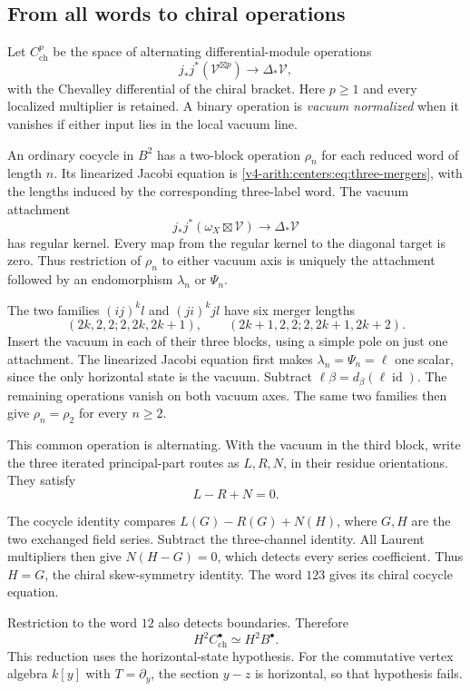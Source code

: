 \subsection{From all words to chiral operations}
\label{v4-arith:centers:subsec:word-reduction}

Let $C^p_{\mathrm{ch}}$
be the space of alternating
differential-module operations
\[
 j_*j^*(\mathscr V^{\boxtimes p})
 \longrightarrow\Delta_*\mathscr V,
\]
with the Chevalley differential
of the chiral bracket.
Here $p\geq1$ and every
localized multiplier is
retained. A binary
operation is
\emph{vacuum normalized}
when it vanishes if
either input lies in
the local vacuum line.

An ordinary cocycle in
$B^2$ has a two-block
operation $\rho_n$ for
each reduced word of
length $n$. Its linearized
Jacobi equation is
\eqref{v4-arith:centers:eq:three-mergers},
with the lengths induced
by the corresponding
three-label word.
The vacuum attachment
\[
 j_*j^*(\omega_X\boxtimes\mathscr V)
 \longrightarrow\Delta_*\mathscr V
\]
has regular kernel.
Every map from the
regular kernel to the
diagonal target is zero.
Thus restriction of
$\rho_n$ to either
vacuum axis is uniquely
the attachment followed
by an endomorphism
$\lambda_n$ or $\Psi_n$.

The two families
$(ij)^kl$ and $(ji)^kjl$
have six merger lengths
\[
 (2k,2,2;2,2k,2k+1),\qquad
 (2k+1,2,2;2,2k+1,2k+2).
\]
Insert the vacuum in
each of their three
blocks, using a simple
pole on just one
attachment. The
linearized Jacobi equation
first makes
$\lambda_n=\Psi_n=\ell$
one scalar, since the
only horizontal state
is the vacuum. Subtract
$\ell\beta=d_\beta(\ell\operatorname{id})$.
The remaining operations
vanish on both vacuum
axes. The same two
families then give
$\rho_n=\rho_2$ for
every $n\geq2$.

This common operation
is alternating. With
the vacuum in the
third block, write
the three iterated
principal-part routes
as $L,R,N$, in their
residue orientations.
They satisfy
\[
 L-R+N=0.
\]

The cocycle identity
compares $L(G)-R(G)+N(H)$,
where $G,H$ are the
two exchanged field
series. Subtract the
three-channel identity.
All Laurent multipliers
then give $N(H-G)=0$,
which detects every
series coefficient.
Thus $H=G$, the
chiral skew-symmetry
identity. The word
$123$ gives its
chiral cocycle
equation.

Restriction to the
word $12$ also detects
boundaries. Therefore
\begin{equation}\label{v4-arith:centers:eq:ordinary-two}
 H^2C^\bullet_{\mathrm{ch}}
 \simeq H^2B^\bullet.
\end{equation}
This reduction uses
the horizontal-state
hypothesis. For the
commutative vertex
algebra $k[y]$ with
$T=\partial_y$, the
section $y-z$ is
horizontal, so that
hypothesis fails.

